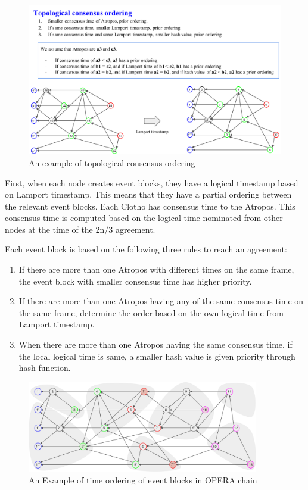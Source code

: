\documentclass{article}
\begin{document}
\begin{figure} \centering  
	\includegraphics[width=1.0\textwidth]{topological_ordering_rule.pdf}
	\caption{An example of topological consensus ordering}
	\label{fig:topological consensus ordering}
\end{figure}

\newpage
First, when each node creates event blocks, they have a logical timestamp based on Lamport timestamp. This means that they have a partial ordering between the relevant event blocks. 
Each Clotho has consensus time to the Atropos. This consensus time is computed based on the logical time nominated from other nodes at the time of the 2n/3 agreement.

Each event block is based on the following three rules to reach an agreement:

\begin{enumerate}
\item If there are more than one Atropos with different times on the same frame, the event block with smaller consensus time has higher priority.
\item If there are more than one Atropos having any of the same consensus time on the same frame, determine the order based on the own logical time from Lamport timestamp.
\item When there are more than one Atropos having the same consensus time, if the local logical time is same, a smaller hash value is given priority through hash function.
\end{enumerate}

\begin{figure} \centering  
	\includegraphics[width=0.9\textwidth]{topological_ordering.pdf}
	\caption{An Example of time ordering of event blocks in OPERA chain}
	\label{fig:sequence of operachain}
\end{figure}
\end{document}
